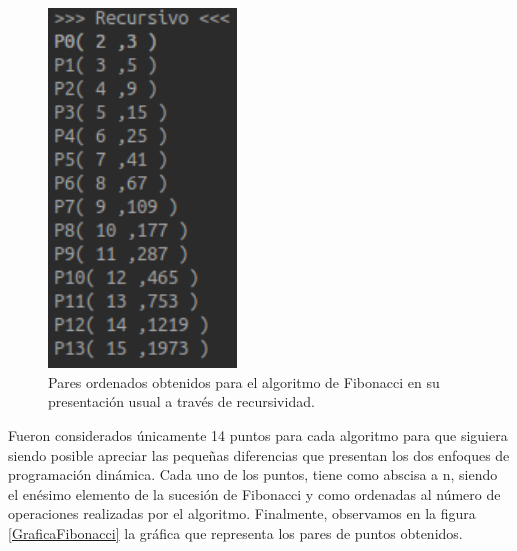     \begin{figure}[h!]
        \centering
        \includegraphics[width=5cm]{Fibonacci/tab-fibo-rec.png}
        \caption{Pares ordenados obtenidos para el algoritmo de Fibonacci en su presentación usual a través de recursividad.}
        \label{TablaFiboRec}
    \end{figure}
    
    \newpage

    Fueron considerados únicamente 14 puntos para cada algoritmo para que siguiera siendo posible apreciar las pequeñas diferencias que presentan los dos enfoques de programación dinámica. Cada uno de los puntos, tiene como abscisa a n, siendo el enésimo elemento de la sucesión de Fibonacci y como ordenadas al número de operaciones realizadas por el algoritmo. Finalmente, observamos en la figura \ref{GraficaFibonacci} la gráfica que representa los pares de puntos obtenidos.
    
